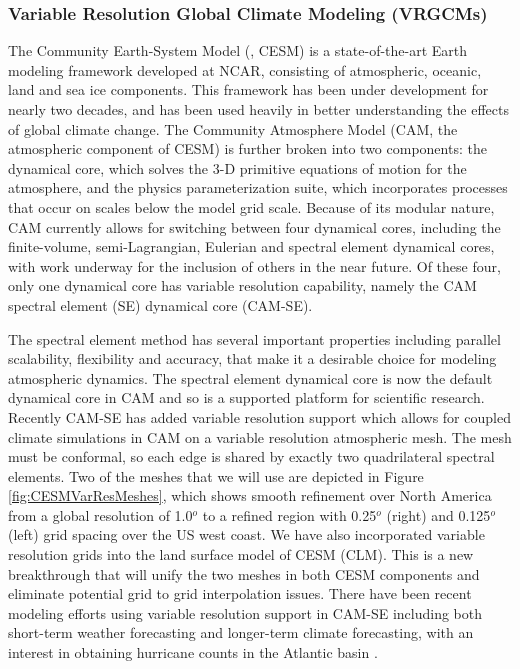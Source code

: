 \documentclass[11pt]{article}
\begin{document}
\subsubsection{Variable Resolution Global Climate Modeling (VRGCMs)}

The Community Earth-System Model (\citet{hurrell2013community}, CESM) is a state-of-the-art Earth modeling framework developed at NCAR, consisting of atmospheric, oceanic, land and sea ice components. This framework has been under development for nearly two decades, and has been used heavily in better understanding the effects of global climate change. The Community Atmosphere Model (CAM, the atmospheric component of CESM) is further broken into two components: the dynamical core, which solves the 3-D primitive equations of motion for the atmosphere, and the physics parameterization suite, which incorporates processes that occur on scales below the model grid scale. Because of its modular nature, CAM currently allows for switching between four dynamical cores, including the finite-volume, semi-Lagrangian, Eulerian and spectral element dynamical cores, with work underway for the inclusion of others in the near future. Of these four, only one dynamical core has variable resolution capability, namely the CAM spectral element (SE) dynamical core (CAM-SE).

The spectral element method has several important properties including parallel scalability, flexibility and accuracy, that make it a desirable choice for modeling atmospheric dynamics.  The spectral element dynamical core \citet{fournier2004spectral, taylor2010compatible} is now the default dynamical core in CAM and so is a supported platform for scientific research. Recently CAM-SE has added variable resolution support which allows for coupled climate simulations in CAM on a variable resolution atmospheric mesh. The mesh must be conformal, so each edge is shared by exactly two quadrilateral spectral elements. Two of the meshes that we will use are depicted in Figure \ref{fig:CESMVarResMeshes}, which shows smooth refinement over North America from a global resolution of 1.0$^{o}$ to a refined region with 0.25$^{o}$ (right) and 0.125$^{o}$ (left) grid spacing over the US west coast.  We have also incorporated variable resolution grids into the land surface model of CESM (CLM).  This is a new breakthrough that will unify the two meshes in both CESM components and eliminate potential grid to grid interpolation issues.  There have been recent modeling efforts using variable resolution support in CAM-SE including both short-term weather forecasting and longer-term climate forecasting, with an interest in obtaining hurricane counts in the Atlantic basin \citep{zarzycki2014using}.
\end{document}
